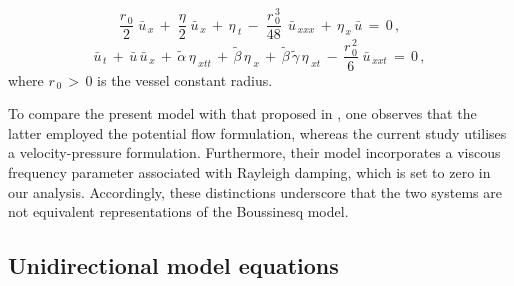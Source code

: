 \documentclass[alpha-refs, 12pt]{wiley-article}
\begin{document}
\begin{equation}\label{eq:bouss1}
  \frac{r_{\,0}}{2}\;\bar{u}_{\,x}\,+\;\frac{\eta}{2}\;\bar{u}_{\,x}\,+\,\eta_{\;t}\,-\;\frac{r_{\,0}^{\,3}}{48}\,\;\bar{u}_{\,xxx}\,+\,\eta_{\,x}\,\bar{u}\,=\,0\,,
\end{equation}
\begin{equation}\label{eq:bouss2}
  \bar{u}_{\,t}\, + \,\bar{u}\,\bar{u}_{\,x}\, + \,\tilde{\alpha}\,\eta_{\;xtt}\, + \,\tilde{\beta}\,\eta_{\;x}\, + \,\tilde{\beta}\,\tilde{\gamma}\,\eta_{\;xt}\, - \,\frac{r_{\,0}^{\,2}}{6}\;\bar{u}_{\,xxt}\, = \,0\,,
\end{equation}
where $r_{\,0}\,>\,0$ is the vessel constant radius.

To compare the present model with that proposed in \cite{Mitsotakis2019}, one observes that the latter employed the potential flow formulation, whereas the current study utilises a velocity-pressure formulation. Furthermore, their model incorporates a viscous frequency parameter associated with Rayleigh damping, which is set to zero in our analysis. Accordingly, these distinctions underscore that the two systems are not equivalent representations of the Boussinesq model.

\subsection{Unidirectional model equations}\label{sec:nondim}
\end{document}
